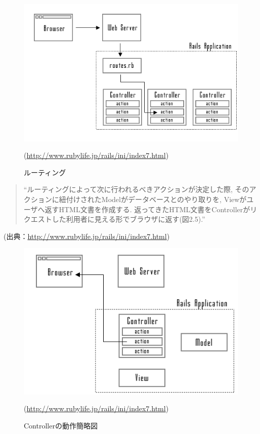 \begin{description}
\begin{itemize}
\begin{figure}
\begin{center}
\includegraphics[width=13cm]{fig/route.png}
\caption{ルーティング}
\end{center}
\begin{flushright}
(\url{http://www.rubylife.jp/rails/ini/index7.html})
\end{flushright}
\end{figure}

\begin{quotation}
“ルーティングによって次に行われるべきアクションが決定した際, そのアクションに紐付けされたModelがデータベースとのやり取りを, Viewがユーザへ返すHTML文書を作成する.
返ってきたHTML文書をControllerがリクエストした利用者に見える形でブラウザに返す(図2.5).”
\end{quotation}
\begin{flushright}
(出典：\url{http://www.rubylife.jp/rails/ini/index7.html})
\end{flushright}

\begin{figure}
\begin{center}
\includegraphics[width=13cm]{fig/controller.png}
\caption{Controllerの動作簡略図}
\end{center}
\begin{flushright}
(\url{http://www.rubylife.jp/rails/ini/index7.html})
\end{flushright}
\end{figure}


\end{itemize}
\end{description}
